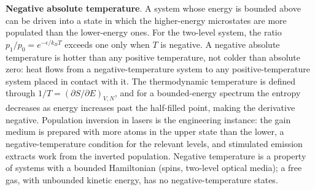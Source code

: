 

\begin{mastery}
\textbf{Negative absolute temperature}. A system whose energy is
bounded above can be driven into a state in which the higher-energy
microstates are more populated than the lower-energy ones. For the
two-level system, the ratio $p_1/p_0 = e^{-\epsilon/k_B T}$ exceeds one
only when $T$ is negative. A negative absolute temperature is hotter
than any positive temperature, not colder than absolute zero: heat
flows from a negative-temperature system to any positive-temperature
system placed in contact with it. The thermodynamic temperature is
defined through $1/T = (\partial S/\partial E)_{V,N}$, and for a
bounded-energy spectrum the entropy decreases as energy increases past
the half-filled point, making the derivative negative. Population
inversion in lasers is the engineering instance: the gain medium is
prepared with more atoms in the upper state than the lower, a
negative-temperature condition for the relevant levels, and stimulated
emission extracts work from the inverted population. Negative
temperature is a property of systems with a bounded Hamiltonian
(spins, two-level optical media); a free gas, with unbounded kinetic
energy, has no negative-temperature states.
\end{mastery}

